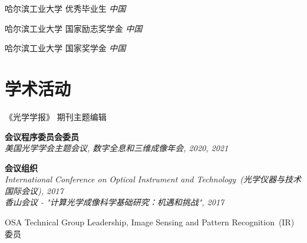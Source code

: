 \documentclass[10pt,a4paper]{moderncv}
\begin{document}

{哈尔滨工业大学}
{优秀毕业生}
{}
{\textit{中国}}
{}

{哈尔滨工业大学}
{国家励志奖学金}
{}
{\textit{中国}}
{}



{哈尔滨工业大学}
{国家奖学金}
{}{\textit{中国}}
{}






\section{学术活动}

{《光学学报》}
{期刊主题编辑}
{}{\textit{}}{}

\textbf{会议程序委员会委员} \\
{\em 
美国光学学会主题会议, 数字全息和三维成像年会, \hfill 2020, 2021\\
}
\vspace{-9pt} 

\textbf{会议组织} \\
{\em 
International Conference on Optical Instrument and Technology~(光学仪器与技术国际会议), \hfill 2017\\ 
香山会议 - "计算光学成像科学基础研究：机遇和挑战", \hfill 2017\\
}
\vspace{-6pt}

{OSA Technical Group Leadership, Image Sensing and Pattern Recognition~(IR)}
{委员}
{}{\textit{}}{}
	
\end{document}
